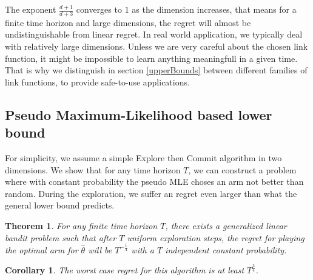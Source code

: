 \documentclass[twoside]{article} \usepackage{aistats2017}
\newtheorem{theorem}{Theorem}
\newtheorem{corollary}{Corollary}[theorem]
\begin{document}
The exponent $\frac{d+1}{d+3}$ converges to $1$ as the dimension increases, that means for a finite time horizon and large dimensions, the regret will almost be undistinguishable from linear regret. 
In real world application, we typically deal with relatively large dimensions. 
Unless we are very careful about the chosen link function, it might be impossible to learn anything meaningfull in a given time.
That is why we distinguish in section \ref{upperBounds} between different families of link functions, to provide safe-to-use applications.

\subsection{Pseudo Maximum-Likelihood based lower bound}
For simplicity, we assume a simple Explore then Commit algorithm in two dimensions. 
We show that for any time horizon $T$, we can construct a problem where with constant probability the pseudo MLE choses an arm not better than random.
During the exploration, we suffer an regret even larger than what the general lower bound predicts.
\begin{theorem}
For any finite time horizon $T$, there exists a generalized linear bandit problem such that after $T$ uniform exploration steps, the regret for playing the optimal arm for $\hat{\theta}$ will be $T^{-\frac{1}{4}}$ with a $T$ independent constant probability.
\end{theorem}
\begin{corollary}
The worst case regret for this algorithm is at least $T^{\frac{3}{4}}$.
\end{corollary}
\end{document}
